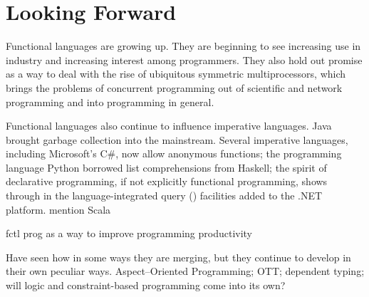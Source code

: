 \section*{Looking Forward}\label{conclusion:forward}
Functional languages are growing up. They are beginning to see increasing use in industry and increasing interest among programmers. They also hold out promise as a way to deal with the rise of ubiquitous symmetric multiprocessors, which brings the problems of concurrent programming out of scientific and network programming and into programming in general.

Functional languages also continue to influence imperative languages. Java brought garbage collection into the mainstream. Several imperative languages, including Microsoft's C\#, now allow anonymous functions; the programming language Python borrowed list comprehensions from Haskell; the spirit of declarative programming, if not explicitly functional programming, shows through in the language-integrated query () facilities added to the .NET platform. mention Scala

fctl prog as a way to improve programming productivity

Have seen how in some ways they are merging, but they continue to develop in their own peculiar ways. Aspect--Oriented Programming; OTT; dependent typing; will logic and constraint-based programming come into its own?